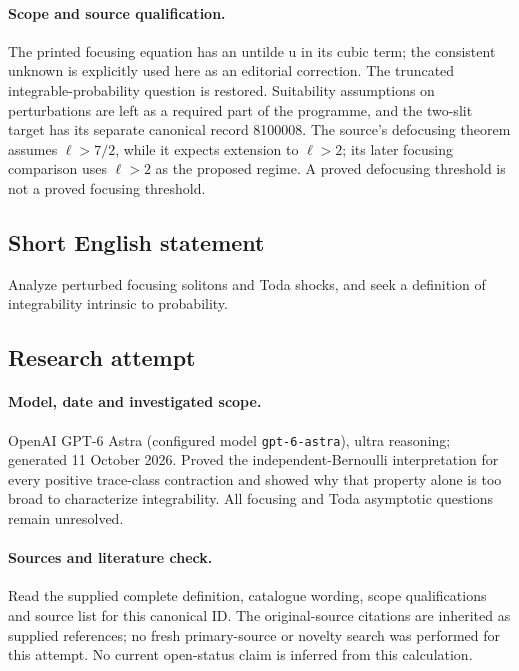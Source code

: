 \documentclass[11pt]{article}
\begin{document}
\paragraph{Scope and source qualification.}The printed focusing equation has an untilde u in its cubic term; the consistent unknown is explicitly used here as an editorial correction. The truncated integrable-probability question is restored. Suitability assumptions on perturbations are left as a required part of the programme, and the two-slit target has its separate canonical record 8100008. The source's defocusing theorem assumes $\ell>7/2$, while it expects extension to $\ell>2$; its later focusing comparison uses $\ell>2$ as the proposed regime. A proved defocusing threshold is not a proved focusing threshold.
\subsection{Short English statement}
Analyze perturbed focusing solitons and Toda shocks, and seek a definition of integrability intrinsic to probability.
\subsection{Research attempt}
\paragraph{Model, date and investigated scope.}
OpenAI GPT-6 Astra (configured model \texttt{gpt-6-astra}), ultra reasoning; generated 11 October 2026. Proved the independent-Bernoulli interpretation for every positive trace-class contraction and showed why that property alone is too broad to characterize integrability. All focusing and Toda asymptotic questions remain unresolved.

\paragraph{Sources and literature check.}
Read the supplied complete definition, catalogue wording, scope qualifications and source list for this canonical ID. The original-source citations are inherited as supplied references; no fresh primary-source or novelty search was performed for this attempt. No current open-status claim is inferred from this calculation.
\end{document}

